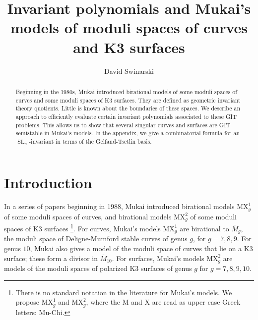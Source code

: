 \documentclass{amsart}[12pt]
\theoremstyle{definition}
\numberwithin{equation}{section}
\newcommand{\SL}{\operatorname{SL}}
\newcommand{\mukai}{\mathrm{MX}}
\begin{document}
\title{Invariant polynomials and Mukai's models of moduli spaces of
  curves and K3 surfaces}


\author{David Swinarski}
\address{Department of Mathematics\\ 
Fordham University\\ 
441 E Fordham Rd\\ 
Bronx, NY 10458}




\date{}

\begin{abstract}
Beginning in the 1980s, Mukai introduced birational models of some
moduli spaces of curves and some moduli spaces of K3 surfaces. They
are defined as geometric invariant theory quotients. Little is known
about the boundaries of these spaces. We describe an approach to
efficiently evaluate certain invariant polynomials associated to these
GIT problems. This allows us to show that several singular curves and
surfaces are GIT semistable in Mukai's models. In the appendix, we
give a combinatorial formula for an $\SL_n$-invariant in terms of the
Gelfand-Tsetlin basis. 
\end{abstract}

\maketitle



\section{Introduction}

In a series of papers beginning in 1988, Mukai introduced birational
models $\mukai^{1}_g$ of some moduli spaces
of curves, and birational models $\mukai^{2}_g$ of some moduli spaces
of K3 surfaces
\cites{Mukai1988,Mukai1992a,Mukai1992b,Mukai1995,Mukai2010}\footnote{There
is no standard notation in the literature for Mukai's models. We
propose $\mukai^{1}_g$ and $\mukai^{2}_g$, where the
$\mathrm{M}$ and $\mathrm{X}$ are read as upper case Greek letters:
Mu-Chi.}. For curves, Mukai's models $\mukai^{1}_g$ are
birational to $\overline{M}_g$, the moduli space of Deligne-Mumford
stable curves of genus $g$, for $g=7,8,9$. For genus $10$, Mukai also
gives a model of the moduli space of curves that lie on a K3 surface;
these form a divisor in $\overline{M}_{10}$.  For surfaces, Mukai's
models $\mukai^{2}_g$ 
are models of the moduli spaces of polarized K3 surfaces of genus
$g$ for $g=7,8,9,10$.
\end{document}
